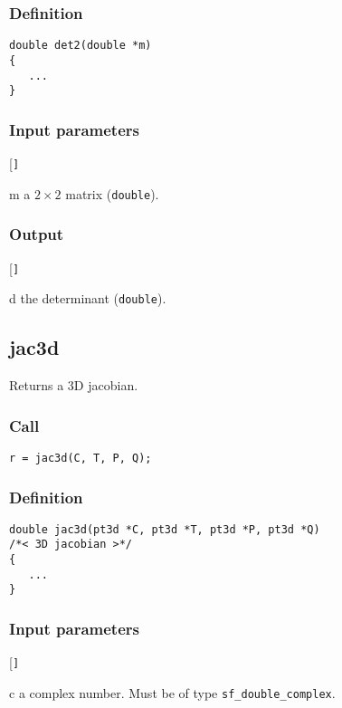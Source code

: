 \subsubsection*{Definition}
\begin{verbatim}
double det2(double *m)
{
   ...
}
\end{verbatim}

\subsubsection*{Input parameters}
\begin{desclist}{\tt }{\quad}[\tt ]
   \setlength\itemsep{0pt}
   \item[m] a $2\times2$ matrix (\texttt{double}).  
\end{desclist}

\subsubsection*{Output}
\begin{desclist}{\tt }{\quad}[\tt ]
   \setlength\itemsep{0pt}
   \item[d] the determinant (\texttt{double}).
\end{desclist}



\subsection{{jac3d}}
Returns a 3D jacobian.

\subsubsection*{Call}
\begin{verbatim}r = jac3d(C, T, P, Q);\end{verbatim}

\subsubsection*{Definition}
\begin{verbatim}
double jac3d(pt3d *C, pt3d *T, pt3d *P, pt3d *Q)
/*< 3D jacobian >*/
{
   ...
}
\end{verbatim}

\subsubsection*{Input parameters}
\begin{desclist}{\tt }{\quad}[\tt ]
   \setlength\itemsep{0pt}
   \item[c] a complex number. Must be of type \texttt{sf\_double\_complex}.  
\end{desclist}

